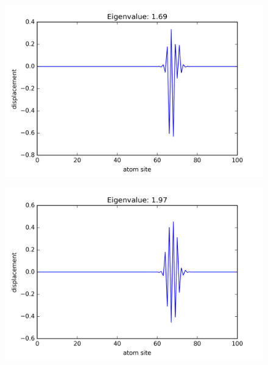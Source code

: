 \begin{figure}[!htbh]
\centering
\begin{minipage}{.45\textwidth}
  \centering
  \includegraphics[width=1.1\linewidth]{Harmonic_mass_ratio/normal_Prob_0_1N_103m_2p_101th.png}
  \label{fig:mass prob 0.1 101th}
\end{minipage}\qquad
\begin{minipage}{.45\textwidth}
  \centering
  \includegraphics[width=1.1\linewidth]{Harmonic_mass_ratio/normal_Prob_0_5N_103m_2p_101th.png}
  \label{fig:mass prob 0.5 101th}
\end{minipage}
\end{figure}


